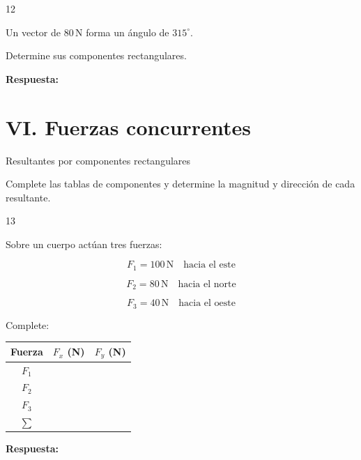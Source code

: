 \documentclass[11pt,letterpaper]{article}
\newcommand{\respuesta}{
\vspace{0.3cm}
\textcolor{morado}{\textbf{Respuesta:}}
\hrulefill
\vspace{0.3cm}
}
\newcommand{\espacio}[1]{
\vspace{#1}
}
\begin{document}
\begin{ejercicio}{12}

Un vector de $80\,\mathrm{N}$
forma un ángulo de $315^\circ$.

Determine sus componentes
rectangulares.

\espacio{4cm}

\respuesta

\end{ejercicio}

\newpage

\section*{VI. Fuerzas concurrentes}

\begin{seccion}{
Resultantes por componentes rectangulares
}

Complete las tablas de componentes
y determine la magnitud y dirección
de cada resultante.

\end{seccion}

\begin{ejercicio}{13}

Sobre un cuerpo actúan tres fuerzas:

\[
F_1=100\,\mathrm{N}
\quad\text{hacia el este}
\]

\[
F_2=80\,\mathrm{N}
\quad\text{hacia el norte}
\]

\[
F_3=40\,\mathrm{N}
\quad\text{hacia el oeste}
\]

Complete:

\begin{center}
\renewcommand{\arraystretch}{1.8}

\begin{tabular}{|c|c|c|}
\hline
Fuerza & $F_x$ (N) & $F_y$ (N)\\
\hline
$F_1$ & &\\
\hline
$F_2$ & &\\
\hline
$F_3$ & &\\
\hline
$\sum$ & &\\
\hline
\end{tabular}
\end{center}

\espacio{3cm}

\respuesta

\end{ejercicio}
\end{document}
